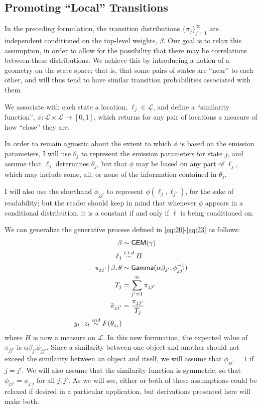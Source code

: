 \subsection{Promoting ``Local'' Transitions}
\label{sec:prom-local-trans}

In the preceding formulation, the transition distributions
$\{\pi_{j}\}_{j=1}^\infty$ are independent
conditioned on the top-level weights, $\beta$.  Our goal is to relax this
assumption, in order to allow for the possibility that there may be
correlations between these distributions.  We achieve this by
introducing a notion of a geometry on the state space; that is, that
some pairs of states are ``near'' to each other, and will thus tend to
have similar transition probabilities associated with them.

We associate with each state a location, $\ell_j \in \mathcal{L}$, and define a
``similarity function'', $\phi: \mathcal{L} \times \mathcal{L} \to
[0,1]$, which returns for any pair of locations a measure of how
``close'' they are.

In order to remain agnostic about the extent to which $\phi$ is
based on the emission parameters, I will use $\theta_j$ to represent
the emission parameters for state $j$, and assume that $\ell_j$
determines $\theta_j$, but that $\phi$ may be based on any part of
$\ell_j$, which may include some, all, or none of the information
contained in $\theta_j$.

I will also use the shorthand $\phi_{jj'}$ to represent 
$\phi(\ell_j, \ell_{j'})$, for the sake of readability; but the reader
should keep in mind that whenever $\phi$ appears in a conditional
distribution, it is a constant if and only if $\ell$ is being
conditioned on.

We can generalize the generative process defined in
\eqref{eq:20}-\eqref{eq:23} as follows:
\begin{align}
  \beta &\sim \mathsf{GEM}(\gamma) \\
  \ell_j &\stackrel{i.i.d}{\sim} H \\
  \pi_{jj'} \, \vert \, \beta, \theta &\sim \mathsf{Gamma}(\alpha \beta_{j'},\phi_{jj'}^{-1}) \\
  T_j &= \sum_{j'=1}^{\infty} \pi_{jj'} \\
  \tilde{\pi}_{jj'} &= \frac{\pi_{jj'}}{T_j} \\
  y_t \, \vert \, z_t \stackrel{ind}{\sim} F(\theta_{z_t})
\end{align}
where $H$ is now a measure on $\mathcal{L}$.
In this new formuation, the expected value of $\pi_{jj'}$ is
$\alpha\beta_{j'}\phi_{jj'}$.  Since a similarity between one object
and another should not exceed the similarity between an object and
itself, we will assume that $\phi_{jj'} = 1$ if $j = j'$.  We will
also assume that the similarity function is symmetric, so that
$\phi_{jj'}  = \phi_{j'j}$ for all $j,j'$.  As
we will see, either or both of these assumptions could be relaxed if
desired in a particular application, but derivations presented here
will make both.

